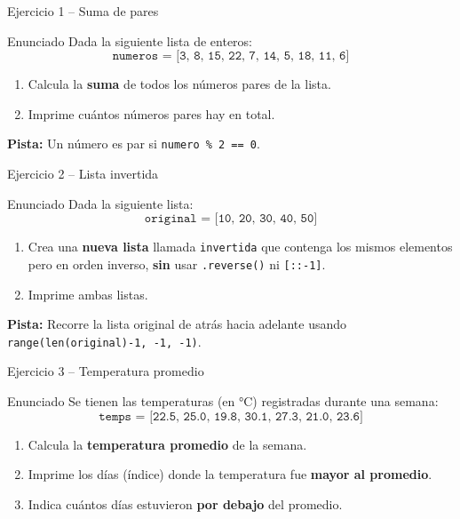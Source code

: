 \documentclass[aspectratio=169,xcolor=dvipsnames]{beamer}
\begin{document}
\begin{frame}{Ejercicio 1 -- Suma de pares}
    \begin{block}{Enunciado}
        Dada la siguiente lista de enteros:
        \[ \texttt{numeros = [3, 8, 15, 22, 7, 14, 5, 18, 11, 6]} \]
        \begin{enumerate}
            \item Calcula la \textbf{suma} de todos los números pares de la lista.
            \item Imprime cuántos números pares hay en total.
        \end{enumerate}
    \end{block}
    \vspace{0.3cm}
    \textbf{Pista:} Un número es par si \texttt{numero \% 2 == 0}.
\end{frame}

\begin{frame}{Ejercicio 2 -- Lista invertida}
    \begin{block}{Enunciado}
        Dada la siguiente lista:
        \[ \texttt{original = [10, 20, 30, 40, 50]} \]
        \begin{enumerate}
            \item Crea una \textbf{nueva lista} llamada \texttt{invertida} que contenga los mismos elementos pero en orden inverso, \textbf{sin} usar \texttt{.reverse()} ni \texttt{[::-1]}.
            \item Imprime ambas listas.
        \end{enumerate}
    \end{block}
    \vspace{0.3cm}
    \textbf{Pista:} Recorre la lista original de atrás hacia adelante usando \texttt{range(len(original)-1, -1, -1)}.
\end{frame}

\begin{frame}{Ejercicio 3 -- Temperatura promedio}
    \begin{block}{Enunciado}
        Se tienen las temperaturas (en °C) registradas durante una semana:
        \[ \texttt{temps = [22.5, 25.0, 19.8, 30.1, 27.3, 21.0, 23.6]} \]
        \begin{enumerate}
            \item Calcula la \textbf{temperatura promedio} de la semana.
            \item Imprime los días (índice) donde la temperatura fue \textbf{mayor al promedio}.
            \item Indica cuántos días estuvieron \textbf{por debajo} del promedio.
        \end{enumerate}
    \end{block}
\end{frame}
\end{document}
